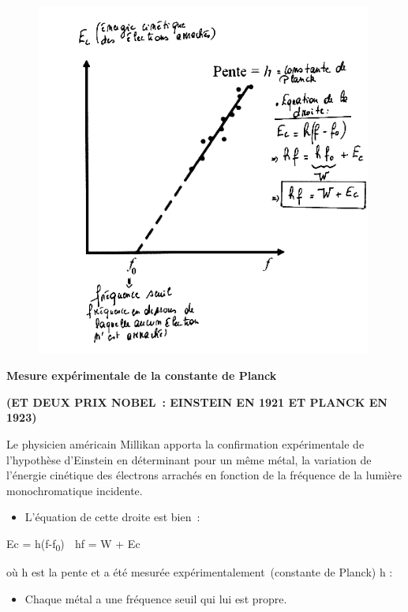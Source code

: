 \begin{figure}
\centering
\includegraphics[width=11.102cm,height=11.633cm]{Pictures/10000001000001F0000002085D0C02E9A126192D.png}
\caption{}
\end{figure}

\textbf{Mesure expérimentale de la constante de Planck}

\textbf{(ET DEUX PRIX NOBEL~: EINSTEIN EN 1921 ET PLANCK EN 1923)}



Le physicien américain Millikan apporta la confirmation expérimentale de
l'hypothèse d'Einstein en déterminant pour un même métal, la variation
de l'énergie cinétique des électrons arrachés en fonction de la
fréquence de la lumière monochromatique incidente.

\begin{itemize}

\item
  L'équation de cette droite est bien~:
\end{itemize}

Ec = h(f-f\textsubscript{0})  hf = W + Ec

où h est la pente et a été mesurée expérimentalement~(constante de
Planck) h :

\begin{itemize}

\item
  Chaque métal a une fréquence seuil qui lui est propre.
\end{itemize}

